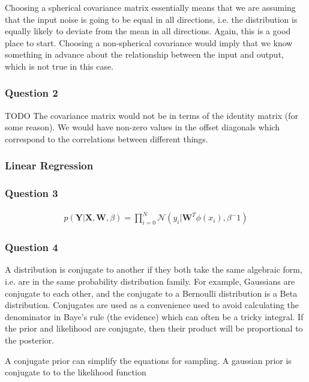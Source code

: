 \documentclass[10pt, a4paper, twocolumn]{article} %
\begin{document}
Choosing a spherical covariance matrix essentially means that we are assuming that the input noise is going to be equal in all directions, i.e. the distribution is equally likely to deviate from the mean in all directions. Again, this is a good place to start. Choosing a non-spherical covariance would imply that we know something in advance about the relationship between the input and output, which is not true in this case.

\subsubsection*{Question 2}

TODO
The covariance matrix would not be in terms of the identity matrix (for some reason). We would have non-zero values in the offset diagonals which correspond to the correlations between different things.

\subsubsection{Linear Regression}

\subsubsection*{Question 3}

\begin{align}
  p(\mathbf{Y} | \mathbf{X}, \mathbf{W}, \beta) = \prod_{i=0}^N \mathcal{N} (y_i | \mathbf{W}^T\phi(x_i), \beta^-1)
\end{align}

\subsubsection*{Question 4}

A distribution is conjugate to another if they both take the same algebraic form, i.e. are in the same probability distribution family. For example, Gaussians are conjugate to each other, and the conjugate to a Bernoulli distribution is a Beta distribution. Conjugates are used as a convenience used to avoid calculating the denominator in Baye's rule (the evidence) which can often be a tricky integral. If the prior and likelihood are conjugate, then their product will be proportional to the posterior.

A conjugate prior can simplify the equations for sampling. A gaussian prior is conjugate to to the likelihood function
\end{document}

